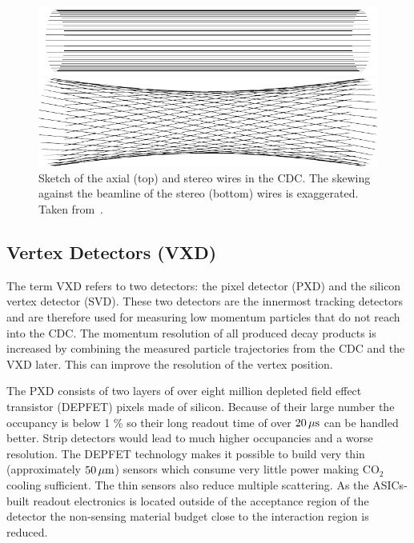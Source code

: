 \begin{figure}
  \centering
  \includegraphics{figures/experimental_setup/axialLayers.pdf}
  
  \vspace*{1.5cm}
  
  \includegraphics{figures/experimental_setup/stereoLayers.pdf}
  \caption[Sketch of the axial (top) and stereo wires in the CDC.]{Sketch of the axial (top) and stereo wires in the CDC. The skewing against the beamline of the stereo (bottom) wires is exaggerated. Taken from~\cite{oliver}.}
  \label{fig-axial-stereo}
\end{figure}

\subsection{Vertex Detectors (VXD)}
The term VXD refers to two detectors: the pixel detector (PXD) and the silicon vertex detector (SVD). These two detectors are the innermost tracking detectors and are therefore used for measuring low momentum particles that do not reach into the CDC. The momentum resolution of all produced decay products is increased by combining the measured particle trajectories from the CDC and the VXD later. This can improve the resolution of the vertex position.

The PXD consists of two layers of over eight million depleted field effect transistor (DEPFET) pixels made of silicon. Because of their large number the occupancy is below 1 \% so their long readout time of over $\unit[20]{\mu s}$ can be handled better. Strip detectors would lead to much higher occupancies and a worse resolution.
The DEPFET technology makes it possible to build very thin (approximately $\unit[50]{\mu m}$) sensors which consume very little power making $\mathrm{CO}_2$ cooling sufficient. The thin sensors also reduce multiple scattering. As the ASICs-built readout electronics is located outside of the acceptance region of the detector the non-sensing material budget close to the interaction region is reduced.

